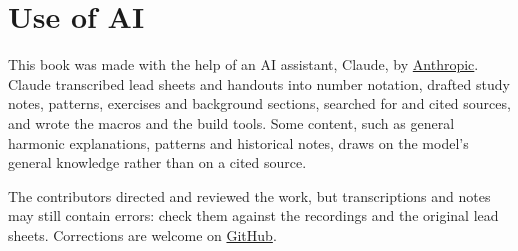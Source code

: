 \section*{Use of AI}
This book was made with the help of an AI assistant, Claude, by
\href{https://www.anthropic.com/}{Anthropic}. Claude transcribed lead sheets and handouts
into number notation, drafted study notes, patterns, exercises and background sections,
searched for and cited sources, and wrote the macros and the build tools. Some content,
such as general harmonic explanations, patterns and historical notes, draws on the
model's general knowledge rather than on a cited source.

The contributors directed and reviewed the work, but transcriptions and notes may still contain
errors: check them against the recordings and the original lead sheets. Corrections are
welcome on \href{https://github.com/enridaga/nerdbook}{GitHub}.
